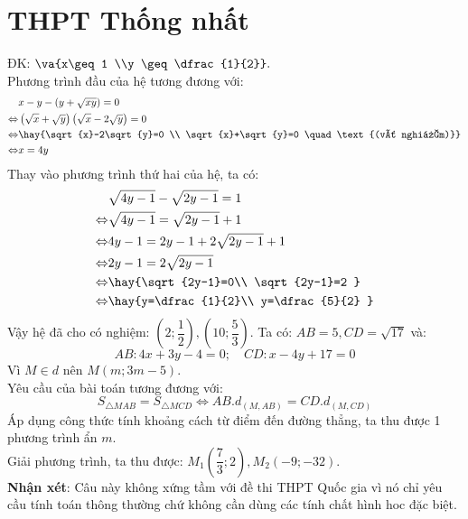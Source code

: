 \section{THPT Thống nhất}
\lgi
ĐK: $\va{x\geq 1 \\y \geq \dfrac{1}{2}}.$ \\
Phương trình đầu của hệ tương đương với:
\begin{align*}
& x-y-(y+\sqrt{xy})=0 \\
\Leftrightarrow & \left(\sqrt{x}+\sqrt{y}\right)\left(\sqrt{x}-2\sqrt{y}\right) = 0\\
\Leftrightarrow & \hay{\sqrt{x}-2\sqrt{y}=0 \\ \sqrt{x}+\sqrt{y}=0 \quad \text{(vô nghiệm)}} \\
\Leftrightarrow & x=4y
\end{align*}
Thay vào phương trình thứ hai của hệ, ta có:
\begin{align*}
& \sqrt{4y-1}-\sqrt{2y-1}=1 \\
\Leftrightarrow & \sqrt{4y-1}=\sqrt{2y-1}+1 \\
\Leftrightarrow & 4y-1 = 2y-1 + 2\sqrt{2y-1}+1\\
\Leftrightarrow & 2y-1 = 2\sqrt{2y-1}\\
\Leftrightarrow & \hay{\sqrt{2y-1}=0\\ \sqrt{2y-1}=2 }\\
\Leftrightarrow & \hay{y=\dfrac{1}{2}\\ y=\dfrac{5}{2} }
\end{align*}
Vậy hệ đã cho có nghiệm: $\left(2 ;\dfrac{1}{2}\right), \left(10; \dfrac{5}{3}\right)$.
\hda
Ta có: $AB=5,CD=\sqrt{17}$ và:
$$AB: 4x+3y-4=0; \quad CD:x-4y+17=0$$
Vì $M \in d$ nên $M(m;3m-5)$.\\
Yêu cầu của bài toán tương đương với:
$$S_{\triangle MAB}=S_{\triangle MCD} \Leftrightarrow AB. d_{(M,AB)} = CD.d_{(M,CD)}$$
Áp dụng công thức tính khoảng cách từ điểm đến đường thẳng, ta thu được 1 phương trình ẩn $m$. \\
Giải phương trình, ta thu được:
$M_1\left(\dfrac{7}{3};2\right), M_2(-9;-32)$.\\
\textbf{Nhận xét}: Câu này không xứng tầm với đề thi THPT Quốc gia vì nó chỉ yêu cầu tính toán thông thường chứ không cần dùng các tính chất hình hoc đặc biệt.

